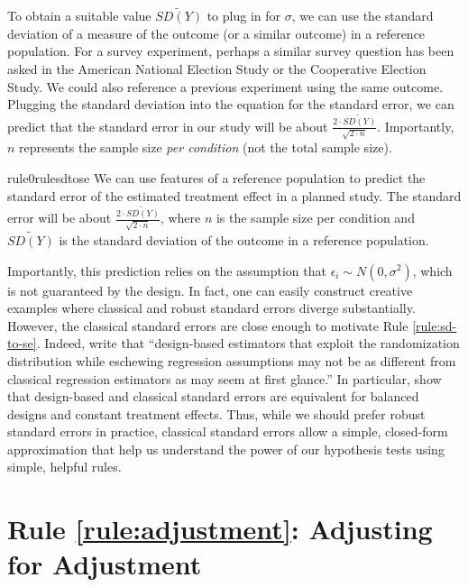 \documentclass[12pt]{article}
\begin{document}
To obtain a suitable value $\widetilde{SD(Y)}$ to plug in for
$\sigma$, we can use the standard deviation of a measure of the
outcome (or a similar outcome) in a reference population. 
For a survey experiment, perhaps a similar survey question has been asked in the American National Election Study or the Cooperative Election Study. 
We could also reference a previous experiment using the same outcome. 
Plugging the standard deviation into the equation for the standard error, we can predict that the standard error in our study will be about $\frac{2 \cdot \widetilde{SD(Y)}}{\sqrt{2 \cdot n}}$. 
Importantly, $n$ represents the sample size \textit{per condition} (not the total sample size).

\begin{restatable}[SD to SE]{rule0}{rulesdtose}
\label{rule:sd-to-se}
We can use features of a reference population to predict the standard error of the estimated treatment effect in a planned study. The standard error will be about $\frac{2 \cdot \widetilde{SD(Y)}}{\sqrt{2 \cdot n}}$, where $n$ is the sample size per condition and $\widetilde{SD(Y)}$ is the standard deviation of the outcome in a reference population.
\end{restatable}

Importantly, this prediction relies on the assumption that $\epsilon_{i} \sim N\left( 0,\sigma^{2} \right)$, which is not guaranteed by the design. 
In fact, one can easily construct creative examples where classical and robust standard errors diverge substantially. 
However, the classical standard errors are close enough
to motivate Rule \ref{rule:sd-to-se}. 
Indeed, \citet[370]{Samii2012} write that ``design-based estimators that exploit the randomization distribution while eschewing regression assumptions may not be as different from classical regression estimators as may seem at first glance.'' 
In particular, \citet[370]{Samii2012} show that design-based and classical
standard errors are equivalent for balanced designs and constant
treatment effects. 
Thus, while we should prefer robust standard errors in practice, classical standard errors allow a simple, closed-form approximation that help us understand the power of our hypothesis tests using simple, helpful rules.

\section*{Rule \ref{rule:adjustment}: Adjusting for Adjustment}
\end{document}
